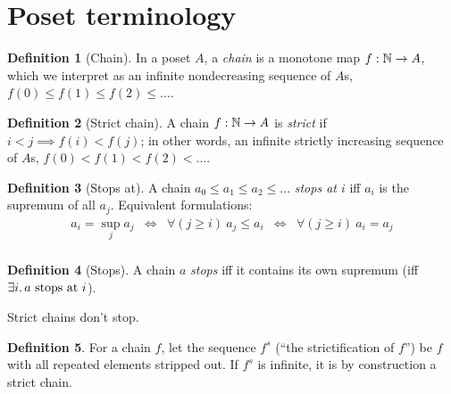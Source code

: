 \documentclass{article}
\theoremstyle{plain}
\theoremstyle{definition}
\newtheorem{definition}{Definition}
\begin{document}
\section{Poset terminology}

\begin{definition}[Chain]
  In a poset $A$, a \emph{chain} is a monotone map $f : \mathbb{N} \to A$, which we
  interpret as an infinite nondecreasing sequence of $A$s, $f(0) \le f(1) \le
  f(2) \le ...$.
\end{definition}

\begin{definition}[Strict chain]
  A chain $f : \mathbb{N} \to A$ is \emph{strict} if $i < j \implies f(i) < f(j)$; in
  other words, an infinite strictly increasing sequence of $A$s, $f(0) < f(1) <
  f(2) < ...$.
\end{definition}

\begin{definition}[Stops at]
  A chain $a_0 \le a_1 \le a_2 \le ...$ \emph{stops at $i$} iff $a_i$ is the
  supremum of all $a_j$. Equivalent formulations:
  \[\begin{array}{ccccc}
    a_i = \sup_j a_j
    &\Leftrightarrow& \forall(j \ge i)\ a_j \le a_i
    &\Leftrightarrow& \forall(j \ge i)\ a_i = a_j\\
  \end{array}\]
\end{definition}

\begin{definition}[Stops]
  A chain $a$ \emph{stops} iff it contains its own supremum (iff $\exists
  i.\, a~\text{stops at}~i$).
\end{definition}

\begin{observation} Strict chains don't stop. \end{observation}

\begin{definition}
  For a chain $f$, let the sequence $f^s$ (``the strictification of $f$'') be
  $f$ with all repeated elements stripped out. If $f^s$ is infinite, it is by
  construction a strict chain.
\end{definition}

\end{document}
